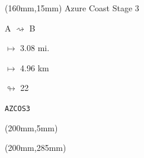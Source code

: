 \begin{textblock*}{40mm}(160mm,15mm)%
Azure Coast Stage 3
\par A $\rightsquigarrow$ B
\Large
\par$\mapsto$ 3.08 mi.
\par$\mapsto$ 4.96 km
\par$\looparrowright$ 22
\par\hfill\tiny\tt AZCOS3\\
\end{textblock*}
\begin{textblock*}{20mm}(200mm,5mm)%
\fbox{\thepage}
\end{textblock*}
\begin{textblock*}{20mm}(200mm,285mm)%
\fbox{\thepage}
\end{textblock*}
\null\newpage


